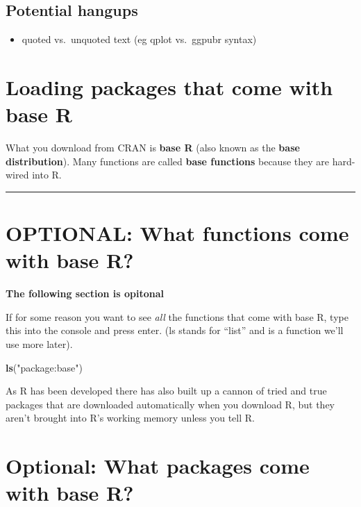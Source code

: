 \documentclass[]{book}
\newenvironment{Shaded}{\begin{snugshade}}{\end{snugshade}}
\newcommand{\KeywordTok}[1]{\textcolor[rgb]{0.13,0.29,0.53}{\textbf{#1}}}
\newcommand{\StringTok}[1]{\textcolor[rgb]{0.31,0.60,0.02}{#1}}
\newcommand{\NormalTok}[1]{#1}
\providecommand{\tightlist}{%
  \setlength{\itemsep}{0pt}\setlength{\parskip}{0pt}}
\theoremstyle{definition}
\theoremstyle{definition}
\theoremstyle{definition}
\theoremstyle{remark}
\begin{document}
\subsection{Potential hangups}\label{potential-hangups}

\begin{itemize}
\tightlist
\item
  quoted vs.~unquoted text (eg qplot vs.~ggpubr syntax)
\end{itemize}

\section{Loading packages that come with base
R}\label{loading-packages-that-come-with-base-r}

What you download from CRAN is \textbf{base R} (also known as the
\textbf{base distribution}). Many functions are called \textbf{base
functions} because they are hard-wired into R.

\begin{center}\rule{0.5\linewidth}{\linethickness}\end{center}

\section{OPTIONAL: What functions come with base
R?}\label{optional-what-functions-come-with-base-r}

\textbf{The following section is opitonal}

If for some reason you want to see \emph{all} the functions that come
with base R, type this into the console and press enter. (ls stands for
``list'' and is a function we'll use more later).

\begin{Shaded}
\begin{Highlighting}[]
\KeywordTok{ls}\NormalTok{(}\StringTok{"package:base"}\NormalTok{)}
\end{Highlighting}
\end{Shaded}

As R has been developed there has also built up a cannon of tried and
true packages that are downloaded automatically when you download R, but
they aren't brought into R's working memory unless you tell R.

\section{Optional: What packages come with base
R?}\label{optional-what-packages-come-with-base-r}
\end{document}
